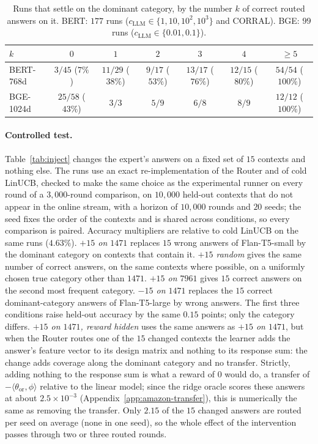 \documentclass[anon]{alt2027} %
\begin{document}
\begin{table}[ht]
\centering
\caption{Runs that settle on the dominant category, by the number $k$ of
correct routed answers on it. BERT: $177$ runs ($c_{\mathrm{LLM}}\in\{1,10,10^2,10^3\}$ and
CORRAL). BGE: $99$ runs ($c_{\mathrm{LLM}}\in\{0.01,0.1\}$).}
\label{tab:dose}
\small
\begin{tabular}{@{}lcccccc@{}}
\toprule
$k$ & $0$ & $1$ & $2$ & $3$ & $4$ & $\ge5$ \\
\midrule
BERT-768d & $3/45$ ($7\%$) & $11/29$ ($38\%$) & $9/17$ ($53\%$) & $13/17$ ($76\%$) & $12/15$ ($80\%$) & $54/54$ ($100\%$) \\
BGE-1024d & $25/58$ ($43\%$) & $3/3$ & $5/9$ & $6/8$ & $8/9$ & $12/12$ ($100\%$) \\
\bottomrule
\end{tabular}
\end{table}

\paragraph{Controlled test.}
Table~\ref{tab:inject} changes the expert's answers on a fixed set of $15$
contexts and nothing else. The runs use an exact re-implementation of the
Router and of cold LinUCB, checked to make the same choice as the
experimental runner on every round of a $3{,}000$-round comparison, on
$10{,}000$ held-out contexts that do not appear in the online stream, with a
horizon of $10{,}000$ rounds and $20$ seeds; the seed fixes the order of the
contexts and is shared across conditions, so every comparison is paired.
Accuracy multipliers are relative to cold LinUCB on the same runs ($4.63\%$).
\emph{$+15$ on $1471$} replaces $15$ wrong answers of Flan-T5-small by the
dominant category on contexts that contain it. \emph{$+15$ random} gives the
same number of correct answers, on the same contexts where possible, on a
uniformly chosen true category other than $1471$. \emph{$+15$ on $7961$}
gives $15$ correct answers on the second most frequent category.
\emph{$-15$ on $1471$} replaces the $15$ correct dominant-category answers of
Flan-T5-large by wrong answers. The first three conditions raise held-out
accuracy by the same $0.15$ points; only the category differs.
\emph{$+15$ on $1471$, reward hidden} uses the same answers as \emph{$+15$ on
$1471$}, but when the Router routes one of the $15$ changed contexts the
learner adds the answer's feature vector to its design matrix and nothing to
its response sum: the change adds coverage along the dominant category and no
transfer. Strictly, adding nothing to the response sum is what a reward of
$0$ would do, a transfer of $-\langle\theta_{\mathrm{or}},\phi\rangle$
relative to the linear model; since the ridge oracle scores these answers at
about $2.5\times10^{-3}$ (Appendix~\ref{app:amazon-transfer}), this is
numerically the same as removing the transfer. Only $2.15$ of the $15$ changed answers are routed per seed on
average (none in one seed), so the whole effect of the intervention passes
through two or three routed rounds.
\end{document}
